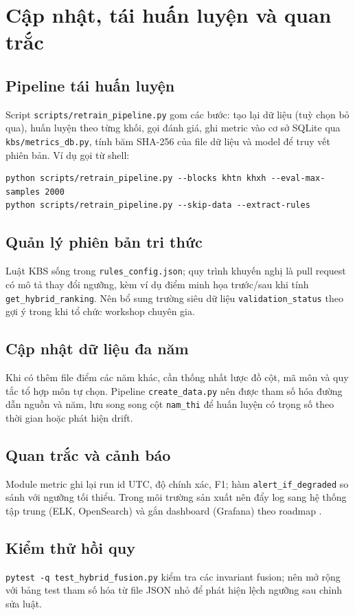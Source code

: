 \chapter{Cập nhật, tái huấn luyện và quan trắc}

\section{Pipeline tái huấn luyện}
Script \texttt{scripts/retrain\_pipeline.py} gom các bước: tạo lại dữ liệu (tuỳ chọn bỏ qua), huấn luyện theo từng khối, gọi đánh giá, ghi metric vào cơ sở SQLite qua \texttt{kbs/metrics\_db.py}, tính băm SHA-256 của file dữ liệu và model để truy vết phiên bản. Ví dụ gọi từ shell:
\begin{lstlisting}
python scripts/retrain_pipeline.py --blocks khtn khxh --eval-max-samples 2000
python scripts/retrain_pipeline.py --skip-data --extract-rules
\end{lstlisting}

\section{Quản lý phiên bản tri thức}
Luật KBS sống trong \texttt{rules\_config.json}; quy trình khuyến nghị là pull request có mô tả thay đổi ngưỡng, kèm ví dụ điểm minh họa trước/sau khi tính \texttt{get\_hybrid\_ranking}. Nên bổ sung trường siêu dữ liệu \texttt{validation\_status} theo gợi ý trong \cite{docs_eval} khi tổ chức workshop chuyên gia.

\section{Cập nhật dữ liệu đa năm}
Khi có thêm file điểm các năm khác, cần thống nhất lược đồ cột, mã môn và quy tắc tổ hợp môn tự chọn. Pipeline \texttt{create\_data.py} nên được tham số hóa đường dẫn nguồn và năm, lưu song song cột \texttt{nam\_thi} để huấn luyện có trọng số theo thời gian hoặc phát hiện drift.

\section{Quan trắc và cảnh báo}
Module metric ghi lại run id UTC, độ chính xác, F1; hàm \texttt{alert\_if\_degraded} so sánh với ngưỡng tối thiểu. Trong môi trường sản xuất nên đẩy log sang hệ thống tập trung (ELK, OpenSearch) và gắn dashboard (Grafana) theo roadmap \cite{docs_eval}.

\section{Kiểm thử hồi quy}
\texttt{pytest -q test\_hybrid\_fusion.py} kiểm tra các invariant fusion; nên mở rộng với bảng test tham số hóa từ file JSON nhỏ để phát hiện lệch ngưỡng sau chỉnh sửa luật.

